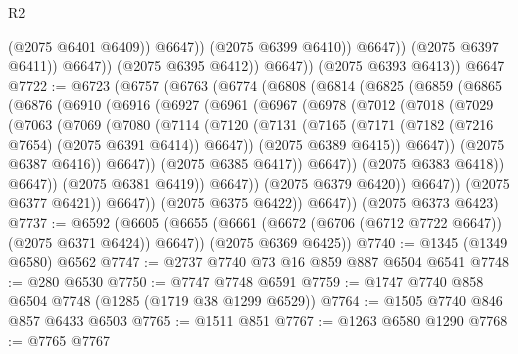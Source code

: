 \begin{lexlean}{R2}
\begin{coremodule}
                              (@2075 @6401 @6409))
                            @6647))
                        (@2075 @6399 @6410))
                      @6647))
                  (@2075 @6397 @6411))
                @6647))
            (@2075 @6395 @6412))
          @6647))
      (@2075 @6393 @6413))
    @6647
@7722 := @6723
    (@6757
      (@6763
        (@6774
          (@6808
            (@6814
              (@6825
                (@6859
                  (@6865
                    (@6876
                      (@6910
                        (@6916
                          (@6927
                            (@6961
                              (@6967
                                (@6978
                                  (@7012
                                    (@7018
                                      (@7029
                                        (@7063
                                          (@7069
                                            (@7080
                                              (@7114
                                                (@7120
                                                  (@7131
                                                    (@7165
                                                      (@7171
                                                        (@7182 (@7216 @7654) (@2075 @6391 @6414))
                                                        @6647))
                                                    (@2075 @6389 @6415))
                                                  @6647))
                                              (@2075 @6387 @6416))
                                            @6647))
                                        (@2075 @6385 @6417))
                                      @6647))
                                  (@2075 @6383 @6418))
                                @6647))
                            (@2075 @6381 @6419))
                          @6647))
                      (@2075 @6379 @6420))
                    @6647))
                (@2075 @6377 @6421))
              @6647))
          (@2075 @6375 @6422))
        @6647))
    (@2075 @6373 @6423)
@7737 := @6592
    (@6605
      (@6655 (@6661 (@6672 (@6706 (@6712 @7722 @6647)) (@2075 @6371 @6424)) @6647))
      (@2075 @6369 @6425))
@7740 := @1345 (@1349 @6580) @6562
@7747 := @2737 @7740 @73 @16 @859 @887 @6504 @6541
@7748 := @280 @6530
@7750 := @7747 @7748 @6591
@7759 := @1747 @7740 @858 @6504 @7748 (@1285 (@1719 @38 @1299 @6529))
@7764 := @1505 @7740 @846 @857 @6433 @6503
@7765 := @1511 @851
@7767 := @1263 @6580 @1290
@7768 := @7765 @7767

\end{coremodule}
\end{lexlean}
